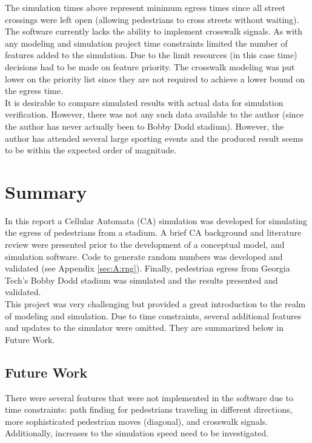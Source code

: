 \documentclass[paper=a4, fontsize=11pt]{scrartcl}
\numberwithin{equation}{section}		%
\numberwithin{figure}{section}			%
\numberwithin{table}{section}		    %
\begin{document}
\noindent
The simulation times above represent minimum egress times since all street crossings were left open 
(allowing pedestrians to cross streets without waiting). The software currently lacks the ability 
to implement crosswalk signals. As with any modeling and simulation project time constraints 
limited the number of features added to the simulation. Due to the limit resources (in this case 
time) decisions had to be made on feature priority. The crosswalk modeling was put lower on the 
priority list since they are not required to achieve a lower bound on the egress time.\\

\noindent
It is desirable to compare simulated results with actual data for simulation verification. However, 
there was not any such data available to the author (since the author has never actually been to 
Bobby Dodd stadium). However, the author has attended several large sporting events and the 
produced result seems to be within the expected order of magnitude. 

\section{Summary}
In this report a Cellular Automata (CA) simulation was developed for simulating the egress of 
pedestrians from a stadium. A brief CA background and literature review were presented prior to the 
development of a conceptual model, and simulation software. Code to generate random numbers was 
developed and validated (see Appendix \ref{sec:A:rng}). Finally, pedestrian egress from Georgia 
Tech's Bobby Dodd stadium was simulated and the results presented and validated.\\

\noindent
This project was very challenging but provided a great introduction to the realm of modeling and 
simulation. Due to time constraints, several additional features and updates to the simulator were 
omitted. They are summarized below in Future Work. 

\subsection{Future Work}
There were several features that were not implemented in the software due to time constraints: path 
finding for pedestrians traveling in different directions, more sophisticated pedestrian moves 
(diagonal), and crosswalk signals. Additionally, increases to the simulation speed need to be 
investigated.
\end{document}
